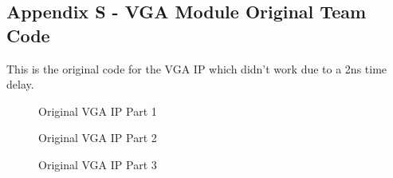 \documentclass[a4paper,12pt]{article}
\begin{document}
\subsection{Appendix S - VGA Module Original Team Code}
\begin{flushleft}
This is the original code for the VGA IP which didn't work due to a 2ns time delay.
\end{flushleft}
\begin{figure}[H]
	\centering
	
		\caption{Original VGA IP Part 1}
\end{figure}
\newpage
\begin{figure}[H]
	\centering
	
		\caption{Original VGA IP Part 2}
\end{figure}
\newpage
\begin{figure}[H]
	\centering
	
		\caption{Original VGA IP Part 3}
\end{figure}
\newpage
{}
\begin{flushleft}

\end{flushleft}
\end{document}
